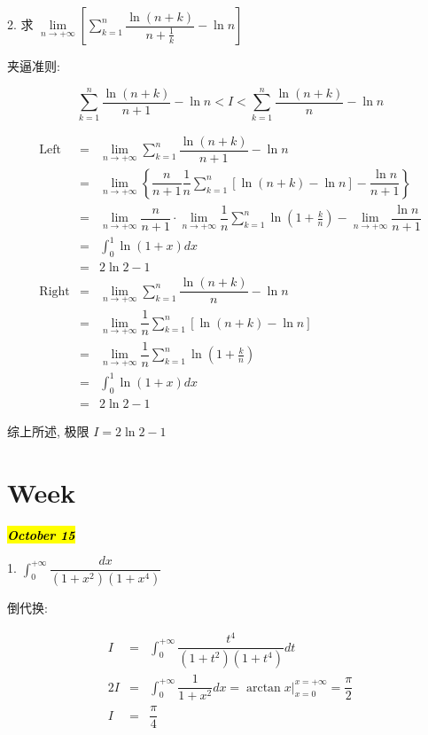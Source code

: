 2. 求 $\lim\limits_{n\rightarrow +\infty}\left[\sum\limits_{k=1}^{n}\dfrac{\ln(n+k)}{n+\frac{1}{k}}-\ln n\right] $ 
\begin{solution}

	夹逼准则:

	$$\sum\limits_{k=1}^{n}\dfrac{\ln(n+k)}{n+1}-\ln n<I<\sum\limits_{k=1}^{n}\dfrac{\ln(n+k)}{n}-\ln n$$

	\begin{eqnarray*}
		\text{Left}  & = & \lim\limits_{n\rightarrow +\infty}\sum\limits_{k=1}^{n}\dfrac{\ln(n+k)}{n+1}-\ln n\\
		             & = & \lim\limits_{n\rightarrow +\infty}\left\lbrace \dfrac{n}{n+1}\dfrac{1}{n}\sum\limits_{k=1}^{n}[\ln(n+k)-\ln n]-\dfrac{\ln n}{n+1}\right\rbrace \\
					 & = & \lim\limits_{n\rightarrow +\infty}\dfrac{n}{n+1}\cdot\lim\limits_{n\rightarrow +\infty}\dfrac{1}{n}\sum\limits_{k=1}^{n}\ln(1+\frac{k}{n})-
					 \lim\limits_{n\rightarrow +\infty}\dfrac{\ln n}{n+1}\\
		             & = & \int_{0}^{1}\ln(1+x)dx\\
		             & = & 2\ln2-1\\
		\text{Right} & = & \lim\limits_{n\rightarrow +\infty}\sum\limits_{k=1}^{n}\dfrac{\ln(n+k)}{n}-\ln n\\
		             & = & \lim\limits_{n\rightarrow +\infty}\dfrac{1}{n}\sum\limits_{k=1}^{n}[\ln(n+k)-\ln n]\\
		             & = & \lim\limits_{n\rightarrow +\infty}\dfrac{1}{n}\sum\limits_{k=1}^{n}\ln(1+\frac{k}{n})\\
		             & = & \int_{0}^{1}\ln(1+x)dx\\
		             & = & 2\ln2-1
	\end{eqnarray*}
	
	综上所述, 极限 $I=2\ln2-1$
\end{solution}

\section{Week }
\hl{\textbf{\textit{October 15}}}

1. $\displaystyle{\int_{0}^{+\infty}\dfrac{dx}{(1+x^2)(1+x^4)}}$
\begin{solution}

	倒代换:

	\begin{eqnarray*}
		I & = & \int_{0}^{+\infty}\dfrac{t^4}{(1+t^2)(1+t^4)}dt \\
	   2I & = & \int_{0}^{+\infty}\dfrac{1}{1+x^2}dx = \arctan x\big|_{x = 0}^{x = +\infty} = \dfrac{\pi}{2}\\
		I & = & \dfrac{\pi}{4}
	\end{eqnarray*}
\end{solution}

